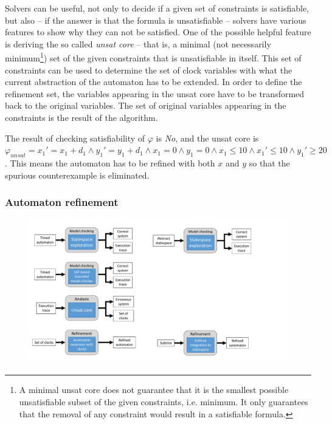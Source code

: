 Solvers can be useful, not only to decide if a given set of constraints is satisfiable, but also -- if the answer is that the formula is unsatisfiable -- solvers have various features to show why they can not be satisfied. One of the possible helpful feature is deriving the so called \emph{unsat core} -- that is, a minimal (not necessarily minimum\footnote{A minimal unsat core does not guarantee that it is the smallest possible unsatisfiable subset of the given constraints, i.e. minimum. It only guarantees that the removal of any constraint would result in a satisfiable formula.}) set of the given constraints that is unsatisfiable in itself. This set of constraints can be used to determine the set of clock variables with what the current abstraction of the automaton has to be extended. In order to define the refinement set, the variables appearing in the unsat core have to be transformed back to the original variables. The set of original variables appearing in the constraints is the result of the algorithm.


\begin{runningExample}
	The result of checking satisfiability of $\varphi$ is \emph{No}, and the unsat core is $\varphi_{unsat}=x_1'=x_1+d_1 \wedge y_1'=y_1+d_1 \wedge x_1=0 \wedge y_1=0 \wedge x_1 \leq 10 \wedge x_1' \leq 10 \wedge y_1' \geq 20$. This means the automaton has to be refined with both $x$ and $y$ so that the spurious counterexample is eliminated.
\end{runningExample}

\subsubsection{Automaton refinement}

\begin{figure}[h]
	\centering
	\includegraphics[width=.7\textwidth]{include/figures/modules_ta_ref}
\end{figure}


